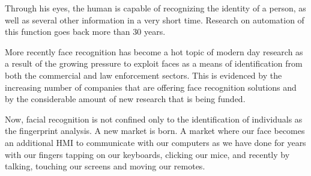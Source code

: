 Through his eyes, the human is capable of recognizing the identity of a person, as well as several other information in a very short time. Research on automation of this function goes back more than 30 years.

More recently face recognition has become a hot topic of modern day research as a result of the growing pressure to exploit faces as a means of identification from both the commercial and law enforcement sectors.
This is evidenced by the
increasing number of companies that are offering face recognition solutions and by the considerable
amount of new research that is being funded.

Now, facial recognition is not confined only to the identification of individuals as the fingerprint analysis. A new market is born. A market where our face becomes an additional HMI to communicate with our computers as we have done for years with our fingers tapping on our keyboards, clicking our mice, and recently by talking, touching our screens and moving our remotes.
